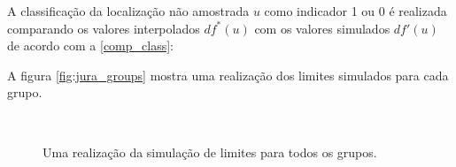 A classificação da localização não amostrada $u$ como indicador 1 ou 0 é realizada comparando os valores interpolados $df^{*}(u)$ com os valores simulados $df'(u)$ de acordo com a \autoref{comp_class}:

A figura \autoref{fig:jura_groups} mostra uma realização dos limites simulados para cada grupo.

\begin{figure}[H]
    \caption{Uma realização da simulação de limites para todos os grupos.} \label{fig:jura_groups}
     \centering
     \hspace{1em}
     \\

\end{figure}
